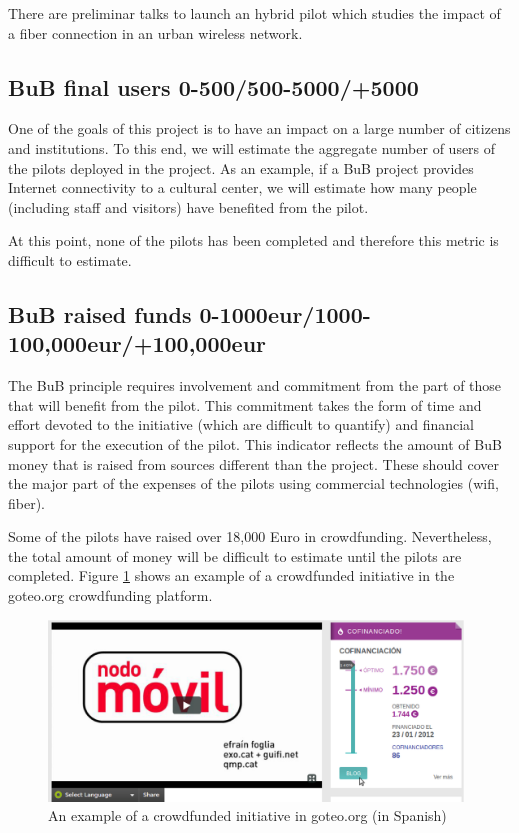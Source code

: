 \documentclass[draftclsnofoot,12pt,journal,onecolumn]{IEEEtran}
\begin{document}
There are preliminar talks to launch an hybrid pilot which studies the impact of a fiber connection in an urban wireless network.

\subsection{BuB final users 0-500/500-5000/+5000}
One of the goals of this project is to have an impact on a large
number of citizens and institutions. To this end, we will estimate the
aggregate number of users of the pilots deployed in the project. As an
example, if a BuB project provides Internet connectivity to a cultural
center, we will estimate how many people (including staff and
visitors) have benefited from the pilot.

At this point, none of the pilots has been completed and therefore this metric is difficult to estimate.

\subsection{BuB raised funds 0-1000eur/1000-100,000eur/+100,000eur}
The BuB principle requires involvement and commitment from the part of
those that will benefit from the pilot. This commitment takes the form
of time and effort devoted to the initiative (which are difficult to
quantify) and financial support for the execution of the pilot. This
indicator reflects the amount of BuB money that is raised from sources
different than the project. These should cover the major part of the
expenses of the pilots using commercial technologies (wifi, fiber).

Some of the pilots have raised over 18,000 Euro in crowdfunding.
Nevertheless, the total amount of money will be difficult to estimate until the pilots are completed.
Figure \ref{fig:crowdfunded} shows an example of a crowdfunded initiative in the goteo.org crowdfunding platform.

\begin{figure}[htbp]
  \centering
  \includegraphics[width = 11cm]{figures/crowdfunded.eps}
  \caption{An example of a crowdfunded initiative in goteo.org (in Spanish)}
  \label{fig:crowdfunded}
\end{figure}
\end{document}
